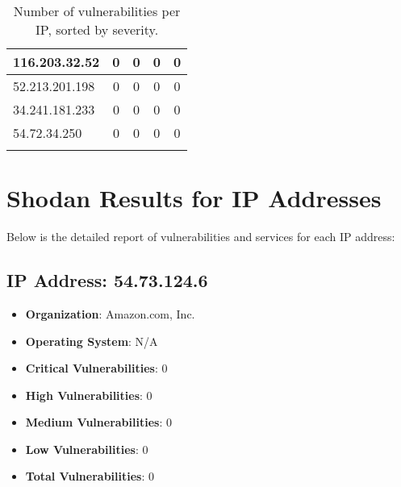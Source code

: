\documentclass{article}
\begin{document}
\begin{longtable}{|>{\raggedright\arraybackslash}p{3cm}|c|c|c|c|}
    
    \rowcolor{lightgreen} %
    
    116.203.32.52 & 0 & 0 & 0 & 0 \\
    \hline
    
    
    \rowcolor{lightgreen} %
    
    52.213.201.198 & 0 & 0 & 0 & 0 \\
    \hline
    
    
    \rowcolor{lightgreen} %
    
    34.241.181.233 & 0 & 0 & 0 & 0 \\
    \hline
    
    
    \rowcolor{lightgreen} %
    
    54.72.34.250 & 0 & 0 & 0 & 0 \\
    \hline
    
    \caption{Number of vulnerabilities per IP, sorted by severity.} \\
\end{longtable}

\clearpage

\section{Shodan Results for IP Addresses}

Below is the detailed report of vulnerabilities and services for each IP address:



\subsection{IP Address: 54.73.124.6}

\begin{itemize}
    \item \textbf{Organization}: Amazon.com, Inc.
    \item \textbf{Operating System}:  N/A 
    \item \textbf{Critical Vulnerabilities}: 0
    \item \textbf{High Vulnerabilities}: 0
    \item \textbf{Medium Vulnerabilities}: 0
    \item \textbf{Low Vulnerabilities}: 0
    \item \textbf{Total Vulnerabilities}: 0
\end{itemize}
\end{document}
